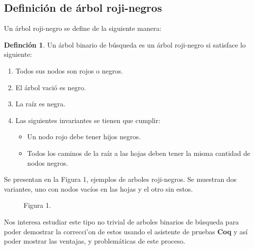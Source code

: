 \documentclass[letterpaper,12pt,oneside]{book}
\newcommand{\coq}{\textbf{Coq}}
\newcommand{\arn}{árbol roji-negro}
\newcommand{\arns}{arboles roji-negros}
\theoremstyle{plain}
\theoremstyle{definition}
\newtheorem{defn}{Definci\'on}[section]
\theoremstyle{remark}
\begin{document}
\subsection{Definici\'on de {{{{\arn}}}s}}
Un {{{\arn}}} se define de la siguiente manera:
\begin{defn}
Un \'arbol binario de búsqueda es un {{{\arn}}} si satisface lo siguiente:
\begin{enumerate}
    \item Todos sus nodos son rojos o negros.
    \item El \'arbol vació es negro.
    \item La raíz es negra.
    \item Las siguientes invariantes se tienen que cumplir:
    \begin{itemize}
        \item Un nodo rojo debe tener hijos negros.
        \item Todos los caminos de la raíz a las hojas deben tener la misma cantidad de nodos negros.
    \end{itemize}
\end{enumerate}
\end{defn}
Se presentan en la Figura 1, ejemplos de {\arns}. Se muestran dos variantes, uno con nodos vacíos en las hojas
y el otro sin estos.


\begin{figure}
\label{arbolRB}
\centering Figura 1.
\end{figure}
Nos interesa estudiar este tipo no trivial de arboles binarios de búsqueda para poder
demostrar la correcci'on de estos usando el asistente de pruebas {\coq} y así poder mostrar las ventajas, y problemáticas de este proceso.
\end{document}
